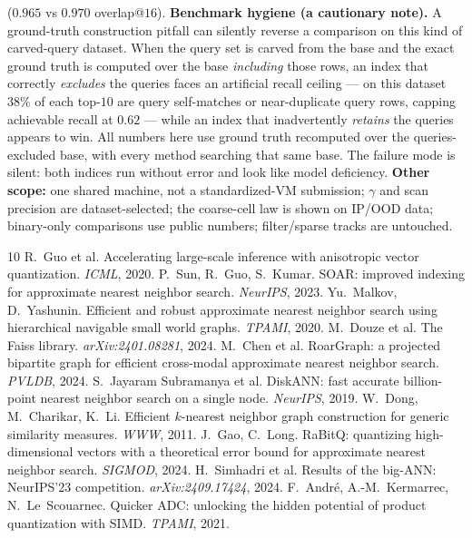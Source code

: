 \documentclass{article}
\begin{document}
($0.965$ vs $0.970$ overlap@$16$).
\textbf{Benchmark hygiene (a cautionary note).} A ground-truth construction
pitfall can silently reverse a comparison on this kind of carved-query dataset. When
the query set is carved from the base and the exact ground truth is computed over the
base \emph{including} those rows, an index that correctly \emph{excludes} the queries
faces an artificial recall ceiling --- on this dataset $38\%$ of each top-$10$ are
query self-matches or near-duplicate query rows, capping achievable recall at $0.62$
--- while an index that inadvertently \emph{retains} the queries appears to win. All
numbers here use ground truth recomputed over the queries-excluded base, with every
method searching that same base. The failure mode is silent: both indices run without
error and look like model deficiency. \textbf{Other scope:} one shared machine, not a
standardized-VM submission; $\gamma$ and scan precision are dataset-selected; the
coarse-cell law is shown on IP/OOD data; binary-only comparisons use public numbers;
filter/sparse tracks are untouched.


\clearpage
\begin{thebibliography}{10}\small
{} R.~Guo et al. Accelerating large-scale inference with anisotropic
vector quantization. \emph{ICML}, 2020.
 P.~Sun, R.~Guo, S.~Kumar. SOAR: improved indexing for approximate
nearest neighbor search. \emph{NeurIPS}, 2023.
 Yu.~Malkov, D.~Yashunin. Efficient and robust approximate nearest
neighbor search using hierarchical navigable small world graphs. \emph{TPAMI}, 2020.
 M.~Douze et al. The Faiss library. \emph{arXiv:2401.08281}, 2024.
 M.~Chen et al. RoarGraph: a projected bipartite graph for
efficient cross-modal approximate nearest neighbor search. \emph{PVLDB}, 2024.
 S.~Jayaram Subramanya et al. DiskANN: fast accurate
billion-point nearest neighbor search on a single node. \emph{NeurIPS}, 2019.
 W.~Dong, M.~Charikar, K.~Li. Efficient $k$-nearest neighbor
graph construction for generic similarity measures. \emph{WWW}, 2011.
 J.~Gao, C.~Long. RaBitQ: quantizing high-dimensional vectors
with a theoretical error bound for approximate nearest neighbor search.
\emph{SIGMOD}, 2024.
 H.~Simhadri et al. Results of the big-ANN: NeurIPS'23
competition. \emph{arXiv:2409.17424}, 2024.
 F.~Andr\'e, A.-M.~Kermarrec, N.~Le~Scouarnec. Quicker ADC:
unlocking the hidden potential of product quantization with SIMD. \emph{TPAMI},
2021.
\end{thebibliography}
\end{document}
